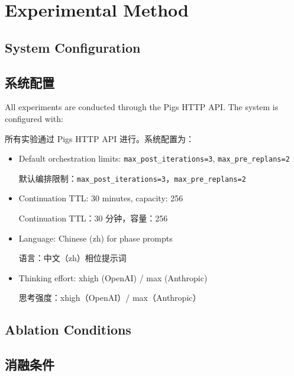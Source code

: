 \section{Experimental Method}
\label{sec:method}

\subsection{System Configuration}
\begin{chinese}
\subsection*{系统配置}
\end{chinese}

All experiments are conducted through the Pigs HTTP API. The system is configured with:
\begin{chinese}
所有实验通过 Pigs HTTP API 进行。系统配置为：
\end{chinese}
\begin{itemize}[nosep]
    \item Default orchestration limits: \texttt{max\_post\_iterations=3}, \texttt{max\_pre\_replans=2}
    \begin{chinese}
    默认编排限制：\texttt{max\_post\_iterations=3}，\texttt{max\_pre\_replans=2}
    \end{chinese}
    \item Continuation TTL: 30 minutes, capacity: 256
    \begin{chinese}
    Continuation TTL：30 分钟，容量：256
    \end{chinese}
    \item Language: Chinese (zh) for phase prompts
    \begin{chinese}
    语言：中文（zh）相位提示词
    \end{chinese}
    \item Thinking effort: xhigh (OpenAI) / max (Anthropic)
    \begin{chinese}
    思考强度：xhigh（OpenAI）/ max（Anthropic）
    \end{chinese}
\end{itemize}

\subsection{Ablation Conditions}
\begin{chinese}
\subsection*{消融条件}
\end{chinese}

